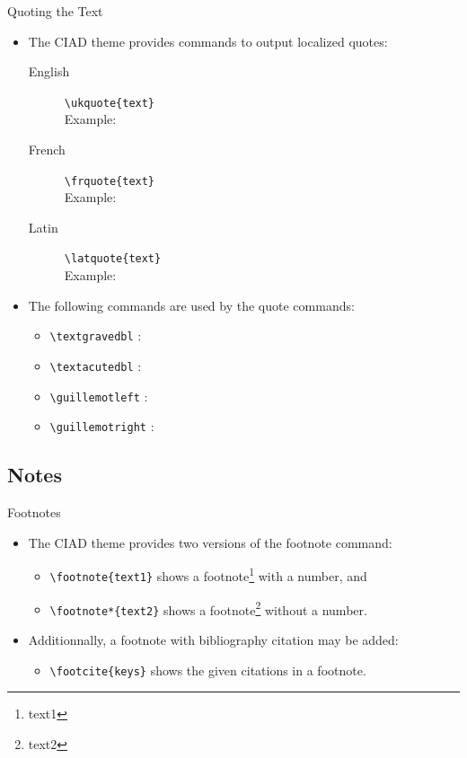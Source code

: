 \documentclass[english,sectioncirclenumberstyle]{ciadbeamer}
\begin{document}
\begin{frame}{Quoting the Text}
	\begin{itemize}
	\item The CIAD theme provides commands to output localized quotes:
		\begin{description}
		\item[English] \texttt{{\textbackslash}ukquote\{text\}} \\
			Example: 
		\item[French] \texttt{{\textbackslash}frquote\{text\}} \\
			Example: 
		\item[Latin] \texttt{{\textbackslash}latquote\{text\}} \\
			Example: 
		\end{description}
	\vspace{1em}
	\item The following commands are used by the quote commands:
		\begin{itemize}
		\item \texttt{{\textbackslash}textgravedbl} : \textgravedbl
		\item \texttt{{\textbackslash}textacutedbl} : \textacutedbl
		\item \texttt{{\textbackslash}guillemotleft} : \guillemotleft
		\item \texttt{{\textbackslash}guillemotright} : \guillemotright
		\end{itemize}
	\end{itemize}
\end{frame}

\subsection{Notes}
\subsectiontableofcontentslide

\begin{frame}{Footnotes}
	\begin{itemize}
	\item The CIAD theme provides two versions of the footnote command:
		\begin{itemize}
		\item \texttt{{\textbackslash}footnote\{text1\}} shows a footnote\footnote{text1} with a number, and
		\item \texttt{{\textbackslash}footnote*\{text2\}} shows a footnote\footnote*{text2} without a number.
		\end{itemize}
	\vspace{1em}
	\item Additionnally, a footnote with bibliography citation may be added:
		\begin{itemize}
		\item \texttt{{\textbackslash}footcite\{keys\}} shows the given citations in a footnote.
		\end{itemize}
	\end{itemize}
\end{frame}
\end{document}
